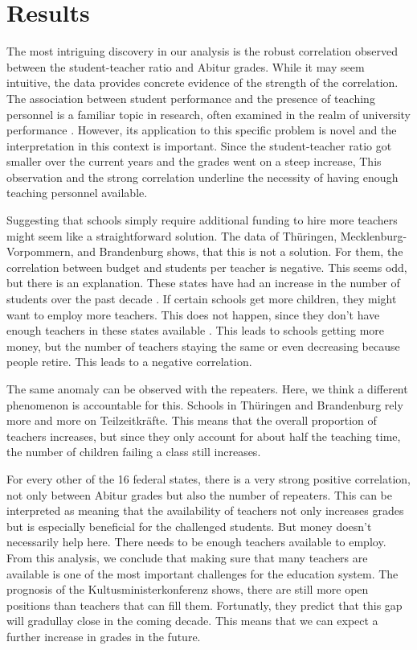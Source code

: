 \section{Results}
The most intriguing discovery in our analysis is the robust correlation observed between the student-teacher ratio and Abitur grades.
While it may seem intuitive, the data provides concrete evidence of the strength of the correlation. 
The association between student performance and the presence of teaching personnel is a familiar topic in research, often examined in the realm of university performance \cite{doi:10.1080/00220485.1984.10845072}. However, its application to this specific problem is novel and the interpretation in this context is important. Since the student-teacher ratio got smaller over the current years and the grades went on a steep increase, This observation and the strong correlation underline the necessity of having enough teaching personnel available.

Suggesting that schools simply require additional funding to hire more teachers might seem like a straightforward solution. The data of Thüringen, Mecklenburg-Vorpommern, and Brandenburg shows, that this is not a solution. For them, the correlation between budget and students per teacher is negative. This seems odd, but there is an explanation. These states have had an increase in the number of students over the past decade \cite{Brandenburg}\cite{Sachsen} \cite{Mecklenburg}. If certain schools get more children, they might want to employ more teachers. This does not happen, since they don't have enough teachers in these states available \cite{Kultusministerkonferenz}. This leads to schools getting more money, but the number of teachers staying the same or even decreasing because people retire. This leads to a negative correlation.

The same anomaly can be observed with the repeaters. Here, we think a different phenomenon is accountable for this. Schools in Thüringen and Brandenburg rely more and more on Teilzeitkräfte. This means that the overall proportion of teachers increases, but since they only account for about half the teaching time, the number of children failing a class still increases.

For every other of the 16 federal states, there is a very strong positive correlation, not only between Abitur grades but also the number of repeaters. This can be interpreted as meaning that the availability of teachers not only increases grades but is especially beneficial for the challenged students. But money doesn't necessarily help here. There needs to be enough teachers available to employ. From this analysis, we conclude that making sure that many teachers are available is one of the most important challenges for the education system. The prognosis of the Kultusministerkonferenz \cite{Kultusministerkonferenz} shows, there are still more open positions than teachers that can fill them. Fortunatly, they predict that this gap will gradullay close in the coming decade.  This means that we can expect a further increase in grades in the future.

